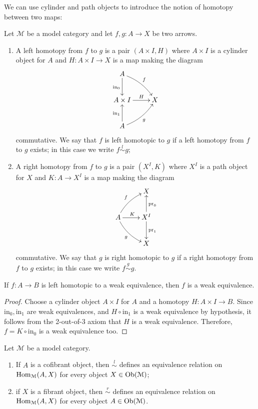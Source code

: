\begin{refsection}
We can use cylinder and path objects to introduce the notion of homotopy between two maps:

\begin{defin}
Let $\mathcal M$ be a model category and let $f,g \colon A \to X$ be two arrows.
\begin{enumerate}
\item A left homotopy from $f$ to $g$ is a pair $(A \times I, H)$ where $A \times I$ is a cylinder object for $A$ and $H \colon A \times I \to X$ is a map making the diagram
\[
\xymatrix{
A \ar[d]_{\mathrm{in}_0} \ar@/^.5pc/[dr]^f \\ A \times I \ar[r]^-H & X \\ A \ar[u]^{\mathrm{in}_1} \ar@/_.5pc/[ur]_g
}
\]
commutative. We say that $f$ is left homotopic to $g$ if a left homotopy from $f$ to $g$ exists; in this case we write $f \stackrel{l}{\sim} g$;

\item A right homotopy from $f$ to $g$ is a pair $(X^I, K)$ where $X^I$ is a path object for $X$ and $K \colon A \to X^I$ is a map making the diagram
\[
\xymatrix{
& X \\
A \ar@/^.5pc/[ur]^f \ar[r]^K \ar@/_.5pc/[dr]_g & X^I \ar[u]_{\mathrm{pr}_0} \ar[d]^{\mathrm{pr}_1} \\ & X
}
\]
commutative. We say that $g$ is right homotopic to $g$ if a right homotopy from $f$ to $g$ exists; in this case we write $f \stackrel{g}{\sim} g$.
\end{enumerate}
\end{defin}

\begin{lemma} \label{lemma homotopy category 0}
If $f \colon A \to B$ is left homotopic to a weak equivalence, then $f$ is a weak equivalence.
\end{lemma}

\begin{proof}
Choose a cylinder object $A \times I$ for $A$ and a homotopy $H \colon A \times I \to B$. Since $\mathrm{in}_0, \mathrm{in}_1$ are weak equivalences, and $H \circ \mathrm{in}_1$ is a weak equivalence by hypothesis, it follows from the 2-out-of-3 axiom that $H$ is a weak equivalence. Therefore, $f = K \circ \mathrm{in}_0$ is a weak equivalence too.
\end{proof}

\begin{lemma} \label{lemma homotopy category 1}
Let $\mathcal M$ be a model category.
\begin{enumerate}
\item If $A$ is a cofibrant object, then $\stackrel{l}{\sim}$ defines an equivalence relation on $\mathrm{Hom}_{\mathcal M}(A,X)$ for every object $X \in \operatorname{Ob}(\mathcal M)$;
\item if $X$ is a fibrant object, then $\stackrel{r}{\sim}$ defines an equivalence relation on $\mathrm{Hom}_{\mathcal M}(A,X)$ for every object $A \in \operatorname{Ob}(\mathcal M)$.
\end{enumerate}
\end{lemma}


\end{refsection}
